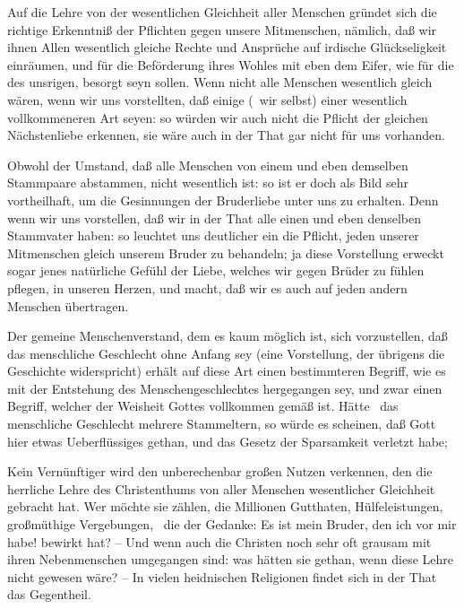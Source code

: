 \begin{aufza}
\item Auf die Lehre von der wesentlichen Gleichheit aller Menschen gründet sich die richtige Erkenntniß der Pflichten gegen unsere Mitmenschen, nämlich, daß wir ihnen Allen wesentlich gleiche Rechte und Ansprüche auf irdische Glückseligkeit einräumen, und für die Beförderung ihres Wohles mit eben dem Eifer, wie für die des unsrigen, besorgt seyn sollen. Wenn nicht alle Menschen wesentlich gleich wären, wenn wir uns vorstellten, daß einige (\zB\ wir selbst) einer wesentlich vollkommeneren Art seyen: so würden wir auch nicht die Pflicht der gleichen Nächstenliebe erkennen, sie wäre auch in der That gar nicht für uns vorhanden.
\item Obwohl der Umstand, daß alle Menschen von einem und eben demselben Stammpaare abstammen, nicht wesentlich ist: so ist er doch als Bild sehr vortheilhaft, um die Gesinnungen der Bruderliebe unter uns zu erhalten. Denn wenn wir uns vorstellen, daß wir in der That alle einen und eben denselben Stammvater haben: so leuchtet uns deutlicher ein die Pflicht, jeden unserer Mitmenschen gleich unserem Bruder zu behandeln; ja diese Vorstellung erweckt sogar jenes natürliche Gefühl der Liebe, welches wir gegen Brüder zu fühlen pflegen, in unseren Herzen, und macht, daß wir es auch auf jeden andern Menschen übertragen.
\item Der gemeine Menschenverstand, dem es kaum möglich ist, sich vorzustellen, daß das menschliche Geschlecht ohne Anfang sey (eine Vorstellung, der übrigens die Geschichte widerspricht) erhält auf diese Art einen bestimmteren Begriff, wie es mit der Entstehung des Menschengeschlechtes hergegangen sey, und zwar einen Begriff, welcher der Weisheit Gottes vollkommen gemäß ist. Hätte \zB\ das menschliche Geschlecht mehrere Stammeltern, so würde es scheinen, daß Gott hier etwas Ueberflüssiges gethan, und das Gesetz der Sparsamkeit verletzt habe; \usw\
\end{aufza}

Kein Vernünftiger wird den unberechenbar großen Nutzen verkennen, den die herrliche Lehre des Christenthums von aller Menschen wesentlicher Gleichheit gebracht hat. Wer möchte sie zählen, die Millionen Gutthaten, Hülfeleistungen, großmüthige Vergebungen, \usw\, die der Gedanke: Es ist mein Bruder, den ich vor mir habe! bewirkt hat? -- Und wenn auch die Christen noch sehr oft grausam mit ihren Nebenmenschen umgegangen sind: was hätten sie gethan, wenn diese Lehre nicht gewesen wäre? -- In vielen heidnischen Religionen findet sich in der That das Gegentheil.


